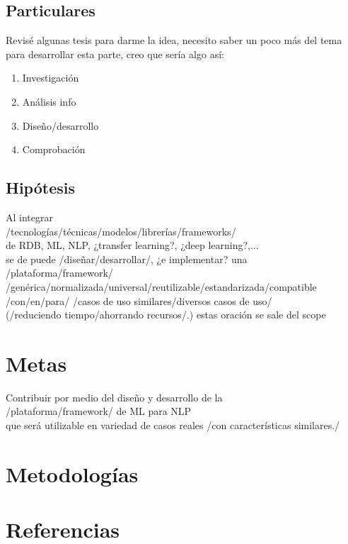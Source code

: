 \documentclass[letterpaper]{article}
\begin{document}
\subsection {Particulares}
Revisé algunas tesis para darme la idea, necesito saber un poco más del tema para desarrollar esta parte, creo que sería algo así:
\begin{enumerate}
    \item Investigación
    \item Análisis info
    \item Diseño/desarrollo
    \item Comprobación
\end{enumerate}
\subsection {Hipótesis}
Al integrar\\
/tecnologías/técnicas/modelos/librerías/frameworks/\\
de RDB, ML, NLP, ¿transfer learning?, ¿deep learning?,...\\
se de puede /diseñar/desarrollar/, ¿e implementar? una\\
/plataforma/framework/\\
/genérica/normalizada/universal/reutilizable/estandarizada/compatible\\
/con/en/para/ /casos de uso similares/diversos casos de uso/\\
(/reduciendo tiempo/ahorrando recursos/.) estas oración se sale del scope

\section {Metas}
Contribuir por medio del diseño y desarrollo de la\\
/plataforma/framework/ de ML para NLP\\
que será utilizable en variedad de casos reales /con características similares./
\section {Metodologías}

\newpage
\section {Referencias}
\printbibliography[heading=none]
\end{document}
